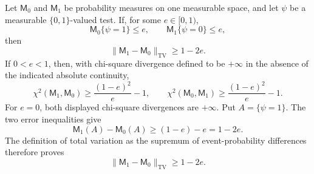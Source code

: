 Let \(\mathsf M_0\) and \(\mathsf M_1\) be probability measures on one measurable space, and let \(\psi\) be a measurable \(\{0,1\}\)-valued test.  If, for some \(e\in[0,1)\),
\[
 \mathsf M_0\{\psi=1\}\le e,
 \qquad
 \mathsf M_1\{\psi=0\}\le e,
\]
then
\[
 \|\mathsf M_1-\mathsf M_0\|_{\mathrm{TV}}\ge 1-2e.
\]
If \(0<e<1\), then, with chi-square divergence defined to be \(+\infty\) in the absence of the indicated absolute continuity,
\[
 \chi^2(\mathsf M_1,\mathsf M_0)
 \ge \frac{(1-e)^2}{e}-1,
 \qquad
 \chi^2(\mathsf M_0,\mathsf M_1)
 \ge \frac{(1-e)^2}{e}-1.
\]
For \(e=0\), both displayed chi-square divergences are \(+\infty\).
Put \(A=\{\psi=1\}\).  The two error inequalities give
\[
 \mathsf M_1(A)-\mathsf M_0(A)
 \ge (1-e)-e=1-2e.
\]
The definition of total variation as the supremum of event-probability differences therefore proves
\[
 \|\mathsf M_1-\mathsf M_0\|_{\mathrm{TV}}\ge1-2e.
\]

